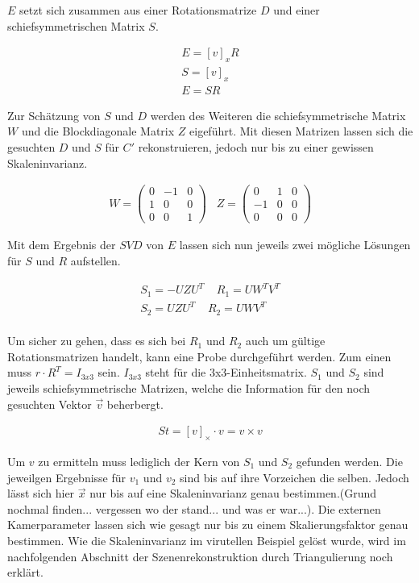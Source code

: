 $E$ setzt sich zusammen aus einer Rotationsmatrize $D$ und einer schiefsymmetrischen Matrix $S$\cite{HZ}. 

\begin{gather}
E=[v]_xR\\
S =[v]_x\\
E=SR
\end{gather}

Zur Schätzung von $S$ und $D$ werden des Weiteren die schiefsymmetrische Matrix \ensuremath{W} und die Blockdiagonale Matrix \ensuremath{Z} eigeführt\cite{HZ}. Mit diesen Matrizen lassen sich die gesuchten $D$ und $S$ für $C'$ rekonstruieren, jedoch nur bis zu einer gewissen Skaleninvarianz\cite{HZ,Ferid}.


\begin{gather}
W = \begin{pmatrix}
0&-1&0\\
1&0&0\\
0&0&1
\end{pmatrix} \;\;\;
Z=
\begin{pmatrix}
0&1&0\\
-1&0&0\\
0&0&0
\end{pmatrix}
\end{gather}

Mit dem Ergebnis der $SVD$ von \ensuremath{E} lassen sich nun jeweils zwei mögliche Lösungen für $S$ und $R$ aufstellen.


\begin{gather}
S_1 = -UZU^T \;\;\;\; R_1 = UW^TV^T\\
S_2 = UZU^T \;\;\;\; R_2 = UWV^T
\end{gather}\\


Um sicher zu gehen, dass es sich bei \ensuremath{R_1} und \ensuremath{R_2} auch um gültige Rotationsmatrizen handelt, kann eine Probe durchgeführt werden. Zum einen muss \ensuremath{r\cdot R^T=I_{3x3}} sein. \ensuremath{I_{3x3}} steht für die 3x3-Einheitsmatrix.  $S_1$ und $S_2$ sind jeweils schiefsymmetrische Matrizen, welche die Information für den noch gesuchten Vektor $\vec{v}$ beherbergt\cite{HZ}. 

\begin{gather}
St = [v]_\times \cdot v = v \times v
\end{gather} 

Um $v$ zu ermitteln muss lediglich der Kern von $S_1$ und $S_2$ gefunden werden. Die jeweilgen Ergebnisse für $v_1$ und $v_2$ sind bis auf ihre Vorzeichen die selben. Jedoch lässt sich hier $\vec{x}$ nur bis auf eine Skaleninvarianz genau bestimmen.(Grund nochmal finden... vergessen wo der stand... und was er war...). Die externen Kamerparameter lassen sich wie gesagt nur bis zu einem Skalierungsfaktor genau bestimmen\cite{HZ,Ferid}. Wie die Skaleninvarianz im virutellen Beispiel gelöst wurde, wird im nachfolgenden Abschnitt der Szenenrekonstruktion durch Triangulierung noch erklärt. \\

